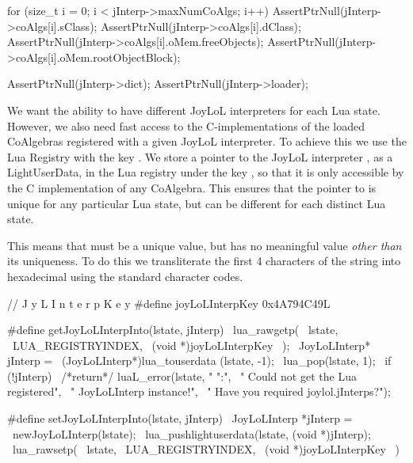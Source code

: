   for (size_t i = 0; i < jInterp->maxNumCoAlgs; i++) {
    AssertPtrNull(jInterp->coAlgs[i].sClass);
    AssertPtrNull(jInterp->coAlgs[i].dClass);
    AssertPtrNull(jInterp->coAlgs[i].oMem.freeObjects);
    AssertPtrNull(jInterp->coAlgs[i].oMem.rootObjectBlock);
  }
  
  AssertPtrNull(jInterp->dict);
  AssertPtrNull(jInterp->loader);
\stopCTest
\stopTestCase
\stopTestSuite


We want the ability to have different JoyLoL interpreters for each Lua 
state. However, we also need fast access to the C-implementations of the 
loaded CoAlgebras registered with a given JoyLoL interpreter. To achieve 
this we use the Lua Registry with the  key 
. We store a pointer to the JoyLoL interpreter 
, as a LightUserData, in the Lua registry under the key 
, so that it is only accessible by the C 
implementation of any CoAlgebra. This ensures that the pointer to 
 is unique for any particular Lua state, but can be 
different for each distinct Lua state. 

This means that  must be a unique value, but has no 
meaningful value \emph{other than} its uniqueness. To do this we 
transliterate the first 4 characters of the string  
into hexadecimal using the standard  character codes. 

\startCHeader
//                         J y L I n t e r p K e y
#define joyLoLInterpKey 0x4A794C49L

#define getJoyLoLInterpInto(lstate, jInterp)      \
  lua_rawgetp(                                    \
    lstate,                                       \
    LUA_REGISTRYINDEX,                            \
    (void *)joyLoLInterpKey                       \
  );                                              \
  JoyLoLInterp* jInterp =                         \
    (JoyLoLInterp*)lua_touserdata (lstate, -1);   \
  lua_pop(lstate, 1);                             \
  if (!jInterp) {                                 \
    /*return*/ luaL_error(lstate, "%
      "\nERROR:\n",                               \
      "  Could not get the Lua registered\n",     \
      "  JoyLoLInterp instance!\n",               \
      "  Have you required joylol.jInterps?\n");  \
  }
\stopCHeader

\setCHeaderStream{private}
\startCHeader
#define setJoyLoLInterpInto(lstate, jInterp)      \
  JoyLoLInterp *jInterp =                         \
    newJoyLoLInterp(lstate);                      \
  lua_pushlightuserdata(lstate, (void *)jInterp); \
  lua_rawsetp(                                    \
    lstate,                                       \
    LUA_REGISTRYINDEX,                            \
    (void *)joyLoLInterpKey                       \
  )
\stopCHeader
\setCHeaderStream{public}

